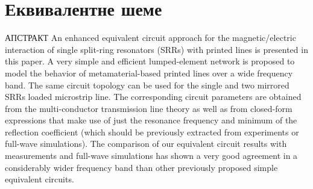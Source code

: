 \newcommand{\SkalaA}{0.1}
\newcommand{\SkalaB}{0.5}
\newcommand{\SirA}{2.0cm}
\newcommand{\SirB}{0.8\textwidth}

\newcommand{\specialcell}[2][c]{%
  \begin{tabular}[#1]{@{}c@{}c@{}}#2\end{tabular}}

\newcommand{\Fig}[1]{сл.~$\!${\ref{#1}}} 
\newcommand{\Sec}[1]{Sec.~$\!${\ref{#1}}} 
\newcommand{\blue}[1]{\textcolor{blue}{#1}}
\newcommand{\red}[1]{\textcolor{red}{#1}}
\newcommand{\comment}[1]{}




\chapter{Еквивалентне шеме}

АПСТРАКТ
An enhanced equivalent circuit approach for the magnetic/electric interaction of single
split-ring resonators (SRRs) with printed lines is presented in this paper. A very simple and
efficient lumped-element network is proposed to model the behavior of metamaterial-based
printed lines over a wide frequency band. The same circuit topology can be used for the single
and two mirrored SRRs loaded microstrip line. The corresponding circuit parameters are obtained
from the multi-conductor transmission line theory as well as from closed-form expressions that
make use of just the resonance frequency and minimum of the reflection coefficient (which
should be previously extracted from experiments or full-wave simulations). The comparison of
our equivalent circuit results with measurements and full-wave simulations has shown a very
good agreement in a considerably wider frequency band than other previously proposed simple
equivalent circuits. 

